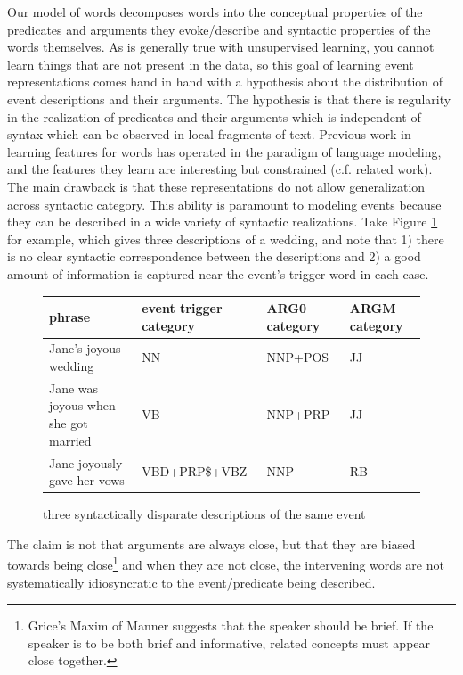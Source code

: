 \documentclass[11pt,letterpaper]{article}
\begin{document}
Our model of words decomposes words into the conceptual properties
of the predicates and arguments they evoke/describe and syntactic properties
of the words themselves.
As is generally true with unsupervised learning, you cannot learn
things that are not present in the data, so this goal of learning event
representations comes hand in hand with a hypothesis about the
distribution of event descriptions and their arguments.
The hypothesis is that there is regularity in the realization of predicates
and their arguments which is independent of syntax which can be observed
in local fragments of text.
Previous work in learning features for words has operated in the
paradigm of language modeling, and the features they learn are
interesting but constrained (c.f. related work).
The main drawback is that these representations do not allow generalization
across syntactic category.
This ability is paramount to modeling events because they can be described
in a wide variety of syntactic realizations.
Take Figure \ref{eventDesc} for example, which gives three descriptions of a wedding,
and note that
1) there is no clear syntactic correspondence between the descriptions
and 2) a good amount of information is captured near the event's trigger word in each case.

\begin{figure}[ht]
\begin{tabular}{ | l | l | l | l | }
\hline
phrase & event trigger category & ARG0 category & ARGM category \\
\hline
Jane's joyous wedding & NN & NNP+POS & JJ \\
Jane was joyous when she got married & VB & NNP+PRP & JJ \\
Jane joyously gave her vows & VBD+PRP\$+VBZ & NNP & RB \\
\hline
\end{tabular}
\caption{three syntactically disparate descriptions of the same event}
\label{eventDesc}
\end{figure}


The claim is not that arguments are always close, but
that they are biased towards being close\footnote{Grice's Maxim of Manner suggests
that the speaker should be brief. If the speaker is to be both brief and informative,
related concepts must appear close together.}
and when they are not close, the intervening words are not
systematically idiosyncratic to the event/predicate being described.
\end{document}
